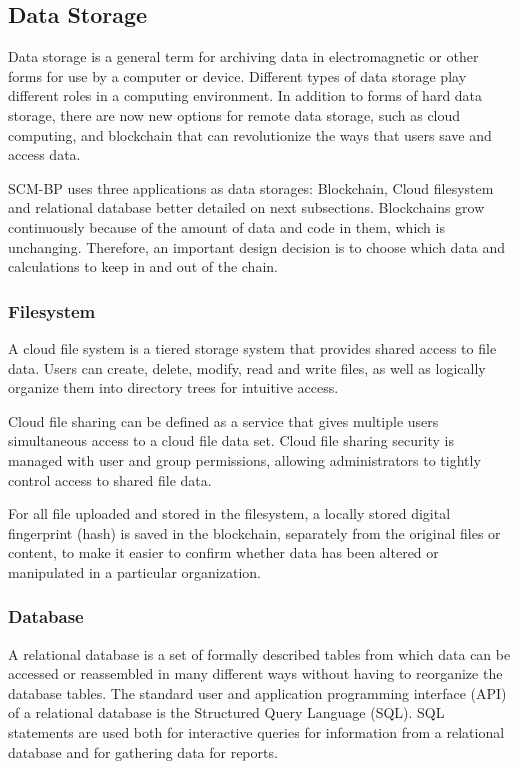 \subsection{Data Storage}\label{sec:DataStorage}
Data storage is a general term for archiving data in electromagnetic or other forms for use by a computer or device. Different types of data storage play different roles in a computing environment. In addition to forms of hard data storage, there are now new options for remote data storage, such as cloud computing, and blockchain that can revolutionize the ways that users save and access data.  

SCM-BP uses three applications as data storages: Blockchain, Cloud filesystem and relational database better detailed on next subsections. Blockchains grow continuously because of the amount of data and code in them, which is unchanging. Therefore, an important design decision is to choose which data and calculations to keep in and out of the chain.

\subsubsection{Filesystem}\label{sec:Filesystem}
A cloud file system is a tiered storage system that provides shared access to file data. Users can create, delete, modify, read and write files, as well as logically organize them into directory trees for intuitive access.

Cloud file sharing can be defined as a service that gives multiple users simultaneous access to a cloud file data set. Cloud file sharing security is managed with user and group permissions, allowing administrators to tightly control access to shared file data.

For all file uploaded and stored in the filesystem, a locally stored digital fingerprint (hash) is saved in the blockchain, separately from the original files or content, to make it easier to confirm whether data has been altered or manipulated in a particular organization.

\subsubsection{Database}\label{sec:Database}
A relational database is a set of formally described tables from which data can be accessed or reassembled in many different ways without having to reorganize the database tables. The standard user and application programming interface (API) of a relational database is the Structured Query Language (SQL). SQL statements are used both for interactive queries for information from a relational database and for gathering data for reports.

